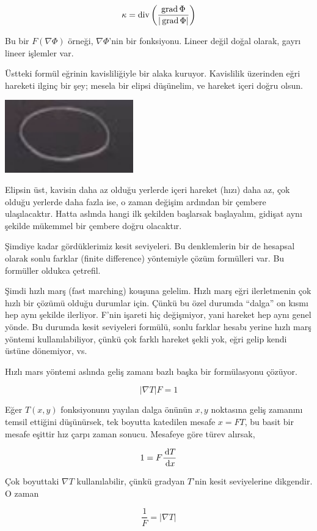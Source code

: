 \documentclass[12pt,fleqn]{article}\usepackage{../../common}
\begin{document}
$$
\kappa = \operatorname{div} \left( \frac{\operatorname{grad} \Phi}{|\operatorname{grad} \Phi|} \right)
$$

Bu bir $F(\nabla \Phi)$ örneği, $\nabla \Phi$'nin bir fonksiyonu. Lineer değil
doğal olarak, gayrı lineer işlemler var.

Üstteki formül eğrinin kavisliliğiyle bir alaka kuruyor. Kavislilik üzerinden
eğri hareketi ilginç bir şey; mesela bir elipsi düşünelim, ve hareket içeri
doğru olsun.

\includegraphics[width=15em]{2_11_06.jpg}

Elipsin üst, kavisin daha az olduğu yerlerde içeri hareket (hızı) daha az, çok
olduğu yerlerde daha fazla ise, o zaman değişim ardından bir çembere
ulaşılacaktır. Hatta aslında hangi ilk şekilden başlarsak başlayalım, gidişat
aynı şekilde mükemmel bir çembere doğru olacaktır.

Şimdiye kadar gördüklerimiz kesit seviyeleri. Bu denklemlerin bir de hesapsal
olarak sonlu farklar (finite difference) yöntemiyle çözüm formülleri var. Bu
formüller oldukca çetrefil. 

Şimdi hızlı marş (fast marching) kouşuna gelelim. Hızlı marş eğri ilerletmenin
çok hızlı bir çözümü olduğu durumlar için. Çünkü bu özel durumda ``dalga'' on
kısmı hep aynı şekilde ilerliyor. F'nin işareti hiç değişmiyor, yani hareket hep
aynı genel yönde. Bu durumda kesit seviyeleri formülü, sonlu farklar hesabı
yerine hızlı marş yöntemi kullanılabiliyor, çünkü çok farklı hareket şekli yok,
eğri gelip kendi üstüne dönemiyor, vs.

Hızlı mars yöntemi aslında geliş zamanı bazlı başka bir formülasyonu
çözüyor.

$$
|\nabla T| F = 1
$$

Eğer $T(x,y)$ fonksiyonunu yayılan dalga önünün $x,y$ noktasına geliş zamanını
temsil ettiğini düşünürsek, tek boyutta katedilen mesafe $x = F T$, bu basit bir
mesafe eşittir hız çarpı zaman sonucu. Mesafeye göre türev alırsak,

$$
1 = F \frac{\,\mathrm{d} T}{\,\mathrm{d} x}
$$

Çok boyuttaki $\nabla T$ kullanılabilir, çünkü gradyan $T$'nin kesit
seviyelerine dikgendir. O zaman

$$ \frac{1}{F} = |\nabla T| $$
\end{document}
